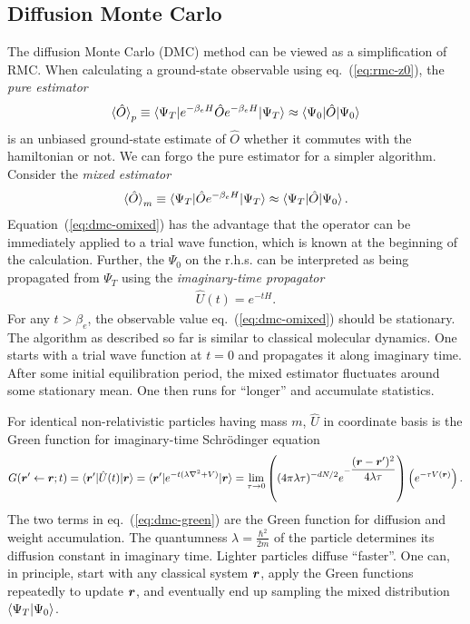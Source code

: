 \subsection{Diffusion Monte Carlo} \label{sec:method-dmc}
The diffusion Monte Carlo (DMC) method can be viewed as a simplification of RMC.
When calculating a ground-state observable using eq.~(\ref{eq:rmc-z0}), the \emph{pure estimator}
\begin{align} \label{eq:dmc-opure}
\braket{\hat{O}}_p \equiv \braket{\Psi_T|e^{-\beta_e H}\hat{O}e^{-\beta_e H}|\Psi_T} \approx \braket{\Psi_0|\hat{O}|\Psi_0}
\end{align}
is an unbiased ground-state estimate of $\hat{O}$ whether it commutes with the hamiltonian or not. We can forgo the pure estimator for a simpler algorithm. Consider the \emph{mixed estimator}
\begin{align} \label{eq:dmc-omixed}
\braket{\hat{O}}_m \equiv \braket{\Psi_T|\hat{O}e^{-\beta_e H}|\Psi_T}\approx\braket{\Psi_T|\hat{O}|\Psi_0}.
\end{align}
Equation~(\ref{eq:dmc-omixed}) has the advantage that the operator can be immediately applied to a trial wave function, which is known at the beginning of the calculation. Further, the $\Psi_0$ on the r.h.s. can be interpreted as being propagated from $\Psi_T$ using the \emph{imaginary-time propagator}
\begin{align}
\hat{U}(t) = e^{-t H}.
\end{align}
For any $t>\beta_e$, the observable value eq.~(\ref{eq:dmc-omixed}) should be stationary. The algorithm as described so far is similar to classical molecular dynamics. One starts with a trial wave function at $t=0$ and propagates it along imaginary time. After some initial equilibration period, the mixed estimator fluctuates around some stationary mean. One then runs for ``longer'' and accumulate statistics.

For identical non-relativistic particles having mass $m$, $\hat{U}$ in coordinate basis is the Green function for imaginary-time Schr\"odinger equation
\begin{align}
G(\boldsymbol{r}'\leftarrow\boldsymbol{r};t) = \braket{\boldsymbol{r}'|\hat{U}(t)|\boldsymbol{r}} =  \braket{\boldsymbol{r}'|e^{-t(\lambda \nabla^2+V)}|\boldsymbol{r}} = \lim\limits_{\tau\rightarrow 0}
\left(
(4\pi\lambda\tau)^{-dN/2}e^{-\dfrac{(\boldsymbol{r}-\boldsymbol{r}')^2}{4\lambda\tau}}
\right)
\left(
e^{-\tau V(\boldsymbol{r})}
\right). \label{eq:dmc-green}
\end{align}
The two terms in eq.~(\ref{eq:dmc-green}) are the Green function for diffusion and weight accumulation.
The quantumness $\lambda=\frac{\hbar^2}{2m}$ of the particle determines its diffusion constant in imaginary time. Lighter particles diffuse ``faster''. One can, in principle, start with any classical system $\boldsymbol{r}$, apply the Green functions repeatedly to update $\boldsymbol{r}$, and eventually end up sampling the mixed distribution $\braket{\Psi_T|\Psi_0}$.

